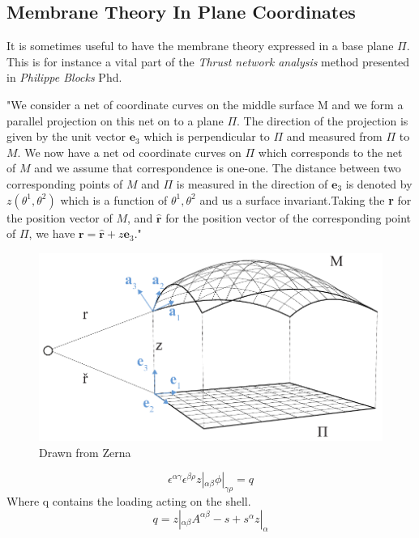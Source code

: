 \subsection{Membrane Theory In Plane Coordinates} \label{sec:planeCoord}
It is sometimes useful to have the membrane theory expressed in a base plane $\Pi$. This is for instance a vital part of the \textit{Thrust network analysis} method presented in \textit{Philippe Blocks} Phd.

"We consider a net of coordinate curves on the middle surface M and we form a parallel projection on this net on to a plane $\Pi$. The direction of the projection is given by the unit vector $\textbf{e}_3$ which is perpendicular to $\Pi$ and measured from $\Pi$ to $M$. We now have a net od coordinate curves on $\Pi$ which corresponds to the net of $M$ and we assume that correspondence is one-one. The distance between two corresponding points of  $M$ and $\Pi$ is measured in the direction of $\textbf{e}_3$ is denoted by $z(\theta^1, \theta^2)$ which is a function of $\theta^1,\theta^2$ and us a surface invariant.Taking the \textbf{r} for the position vector of $M$, and $\hat{\textbf{r}}$ for the position vector of the corresponding point of $\Pi$, we have $\textbf{r} = \hat{\textbf{r}} + z \textbf{e}_3$."

\begin{figure}[H]
\centering
\includegraphics[width=0.9\linewidth ]{figure/Theory/planeShell.pdf}
\caption{Drawn from Zerna }
\end{figure}


\begin{equation}\label{memEq}
\epsilon^{\alpha \gamma}\epsilon^{\beta \rho} z|_{\alpha \beta}\phi|_{\gamma \rho} = q
\end{equation}
Where q contains the loading acting on the shell. 
\begin{equation}
q = z|_{\alpha \beta}A^{\alpha \beta} - s + s^\alpha z |_\alpha
\end{equation}

